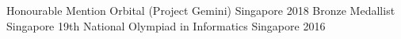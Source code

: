 



\begin{cvhonors}
  \cvhonor
  {Honourable Mention} %
  {Orbital (Project Gemini)} %
  {Singapore} %
  {2018} %
  \cvhonor
  {Bronze Medallist} %
  {Singapore 19th National Olympiad in Informatics} %
  {Singapore} %
  {2016} %




\end{cvhonors}
